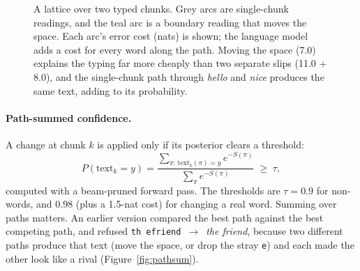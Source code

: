 \documentclass[11pt,a4paper]{article}
\newcommand{\ttw}[1]{\texttt{#1}}
\begin{document}
\begin{figure}[t]
\centering
{}
\caption{A lattice over two typed chunks. Grey arcs are single-chunk readings, and the teal arc is a boundary reading that moves the space. Each arc's error cost (nats) is shown; the language model adds a cost for every word along the path. Moving the space (7.0) explains the typing far more cheaply than two separate slips (11.0 + 8.0), and the single-chunk path through \emph{hello} and \emph{nice} produces the same text, adding to its probability.}
\label{fig:lattice}
\end{figure}

\paragraph{Path-summed confidence.} A change at chunk $k$ is applied only if its posterior clears a threshold:
\begin{equation}
P(\text{text}_k = y) = \frac{\sum_{\pi:\,\text{text}_k(\pi)=y} e^{-S(\pi)}}{\sum_{\pi} e^{-S(\pi)}} \;\geq\; \tau,
\end{equation}
computed with a beam-pruned forward pass. The thresholds are $\tau=0.9$ for non-words, and $0.98$ (plus a 1.5-nat cost) for changing a real word. Summing over paths matters. An earlier version compared the best path against the best competing path, and refused \ttw{th efriend}~$\to$~\emph{the friend}, because two different paths produce that text (move the space, or drop the stray \ttw{e}) and each made the other look like a rival (Figure~\ref{fig:pathsum}).
\end{document}
